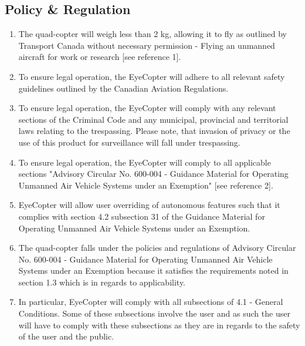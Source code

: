 \documentclass[10pt,letterpaper]{article}
\begin{document}
\subsection{Policy \& Regulation}
\begin{enumerate}[label=\textbf{PR\arabic*}]
	\item The quad-copter will weigh less than 2 kg, allowing it to fly as outlined by Transport Canada without necessary permission - Flying an unmanned aircraft for work or research [see reference 1]. %
    \item To ensure legal operation, the EyeCopter will adhere to all relevant safety guidelines outlined by the Canadian Aviation Regulations. %
    \item To ensure legal operation, the EyeCopter will comply with any relevant sections of the Criminal Code and any municipal, provincial and territorial laws relating to the trespassing. Please note, that invasion of privacy or the use of this product for surveillance will fall under trespassing.
    \item To ensure legal operation, the EyeCopter will comply to all applicable sections "Advisory Circular No. 600-004 - Guidance Material for Operating Unmanned Air Vehicle Systems under an Exemption" [see reference 2].  %
    \item EyeCopter will allow user overriding of autonomous features such that it complies with section 4.2 subsection 31 of the Guidance Material for Operating Unmanned Air Vehicle Systems under an Exemption. %
    \item The quad-copter falls under the policies and regulations of Advisory Circular No. 600-004 - Guidance Material for Operating Unmanned Air Vehicle Systems under an Exemption because it satisfies the requirements noted in section 1.3 which is in regards to applicability.
    \item In particular, EyeCopter will comply with all subsections of 4.1 - General Conditions. Some of these subsections involve the user and as such the user will have to comply with these subsections as they are in regards to the safety of the user and the public.
\end{enumerate}

\end{document}
